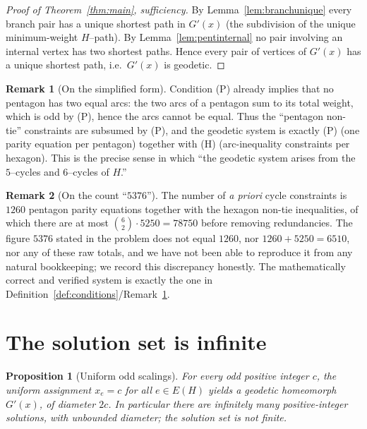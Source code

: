 \documentclass{amsart}
\newtheorem{proposition}{Proposition}
\theoremstyle{definition}
\newtheorem{remark}{Remark}
\begin{document}
\begin{proof}[Proof of Theorem~\ref{thm:main}, sufficiency]
By Lemma~\ref{lem:branchunique} every branch pair has a unique shortest path in
$G'(x)$ (the subdivision of the unique minimum-weight $H$--path). By
Lemma~\ref{lem:pentinternal} no pair involving an internal vertex has two
shortest paths. Hence every pair of vertices of $G'(x)$ has a unique shortest
path, i.e.\ $G'(x)$ is geodetic.
\end{proof}

\begin{remark}[On the simplified form]\label{rem:simpl}
Condition (P) already implies that no pentagon has two equal arcs: the two arcs
of a pentagon sum to its total weight, which is odd by (P), hence the arcs cannot
be equal. Thus the ``pentagon non-tie'' constraints are subsumed by (P), and the
geodetic system is exactly \textnormal{(P)} (one parity equation per pentagon)
together with \textnormal{(H)} (arc-inequality constraints per hexagon). This is
the precise sense in which ``the geodetic system arises from the $5$--cycles and
$6$--cycles of $H$.''
\end{remark}

\begin{remark}[On the count ``$5376$'']\label{rem:5376}
The number of \emph{a priori} cycle constraints is $1260$ pentagon parity
equations together with the hexagon non-tie inequalities, of which there are at
most $\binom{6}{2}\cdot 5250 = 78750$ before removing redundancies. The figure
$5376$ stated in the problem does not equal $1260$, nor $1260+5250=6510$, nor any
of these raw totals, and we have not been able to reproduce it from any natural
bookkeeping; we record this discrepancy honestly. The mathematically correct and
verified system is exactly the one in
Definition~\ref{def:conditions}/Remark~\ref{rem:simpl}.
\end{remark}

\section{The solution set is infinite}

\begin{proposition}[Uniform odd scalings]\label{prop:infinite}
For every odd positive integer $c$, the uniform assignment $x_e=c$ for all
$e\in E(H)$ yields a geodetic homeomorph $G'(x)$, of diameter $2c$. In
particular there are infinitely many positive-integer solutions, with unbounded
diameter; the solution set is \emph{not} finite.
\end{proposition}
\end{document}
